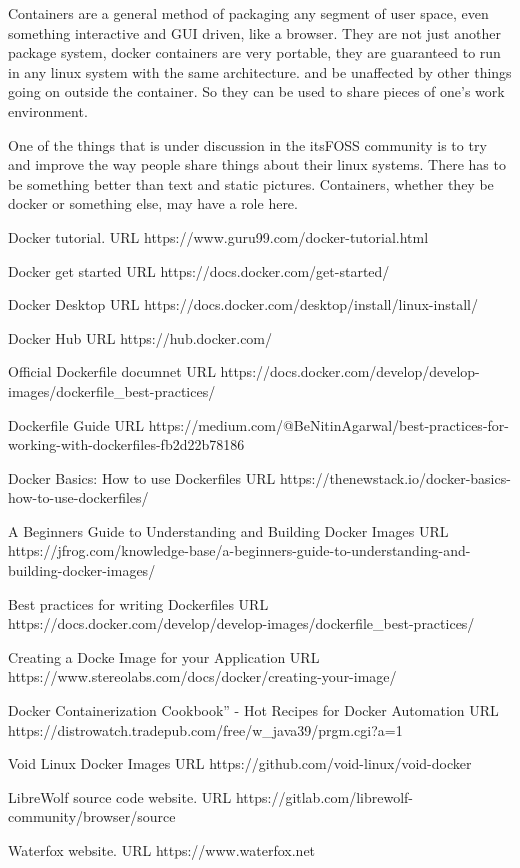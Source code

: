\documentclass{article}  %
\begin{document}
Containers are a general method of packaging any segment of user space, even something interactive and GUI driven, like a browser.  They are not just another package system, docker containers are very portable, they are guaranteed to run in any linux system with the same architecture. and be unaffected by other things going on outside the container. So they can be used to share pieces of one's work environment. 

One of the things that is under discussion in the itsFOSS community is to try and improve the way people share things about their linux systems. There has to be something better than text and static pictures. Containers, whether they be docker or something else, may have a role here.



\begin{thebibliography}{99}

Docker tutorial.
URL https://www.guru99.com/docker-tutorial.html

Docker get started 
URL https://docs.docker.com/get-started/

Docker Desktop
URL https://docs.docker.com/desktop/install/linux-install/

Docker Hub
URL https://hub.docker.com/

Official Dockerfile documnet
URL https://docs.docker.com/develop/develop-images/dockerfile\_best-practices/

Dockerfile Guide
URL https://medium.com/@BeNitinAgarwal/best-practices-for-working-with-dockerfiles-fb2d22b78186

Docker Basics: How to use Dockerfiles
URL https://thenewstack.io/docker-basics-how-to-use-dockerfiles/

A Beginners Guide to Understanding and Building Docker Images
URL https://jfrog.com/knowledge-base/a-beginners-guide-to-understanding-and-building-docker-images/

Best practices for writing Dockerfiles
URL https://docs.docker.com/develop/develop-images/dockerfile\_best-practices/


Creating a Docke Image for your Application
URL https://www.stereolabs.com/docs/docker/creating-your-image/

Docker Containerization Cookbook” - Hot Recipes for Docker Automation
URL https://distrowatch.tradepub.com/free/w\_java39/prgm.cgi?a=1

Void Linux Docker Images
URL https://github.com/void-linux/void-docker


LibreWolf source code website.
URL https://gitlab.com/librewolf-community/browser/source


Waterfox website. URL https://www.waterfox.net


\end{thebibliography}
\end{document}

